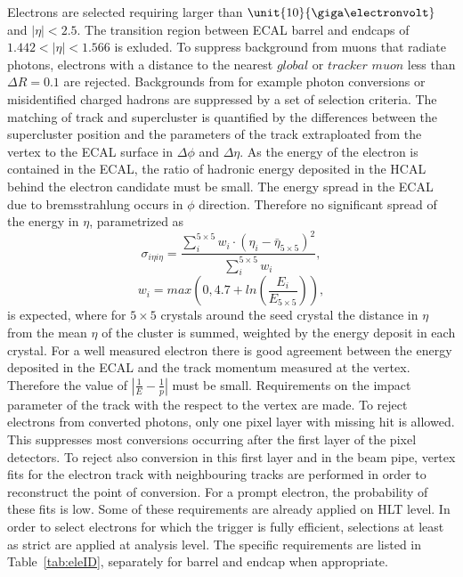 Electrons are selected requiring \pt larger than $\unit{10}{\giga\electronvolt}$ and $|\eta| < 2.5$. The transition region between ECAL barrel and endcaps of $1.442 < |\eta| < 1.566$ is exluded. To suppress background from muons that radiate photons, electrons with a distance to the nearest $\textit{global}$ or $\textit{tracker muon}$ less than $\Delta R = 0.1$ are rejected. Backgrounds from for example photon conversions or misidentified charged hadrons are suppressed by a set of selection criteria. The matching of track and supercluster is quantified by the differences between the supercluster position and the parameters of the track extraploated from the vertex to the ECAL surface in $\Delta\phi$ and $\Delta\eta$. As the energy of the electron is contained in the ECAL, the ratio of hadronic energy deposited in the HCAL behind the electron candidate must be small. The energy spread in the ECAL due to bremsstrahlung occurs in $\phi$ direction. Therefore no significant spread of the energy in $\eta$, parametrized as
\begin{equation}
\sigma_{i\eta i\eta} = \frac{\sum\limits_i^{5\times 5} w_i\cdot (\eta_i - \bar{\eta}_{5\times 5})^2}{\sum\limits_{i}^{5\times 5} w_i},
\end{equation}
\begin{equation}
w_i = max(0,4.7 + ln(\frac{E_i}{E_{5 \times 5}})),
\end{equation}
is expected, where for $5\times 5$ crystals around the seed crystal the distance in $\eta$ from the mean $\eta$ of the cluster is summed, weighted by the energy deposit in each crystal. For a well measured electron there is good agreement between the energy deposited in the ECAL and the track momentum measured at the vertex. Therefore the value of $| \frac{1}{E} - \frac{1}{p}|$ must be small. Requirements on the impact parameter of the track with the respect to the vertex are made. To reject electrons from converted photons, only one pixel layer with missing hit is allowed. This suppresses most conversions occurring after the first layer of the pixel detectors. To reject also conversion in this first layer and in the beam pipe, vertex fits for the electron track with neighbouring tracks are performed in order to reconstruct the point of conversion. For a prompt electron, the probability of these fits is low. Some of these requirements are already applied on HLT level. In order to select electrons for which the trigger is fully efficient, selections at least as strict are applied at analysis level. The specific requirements are listed in Table~\ref{tab:eleID}, separately for barrel and endcap when appropriate. 

